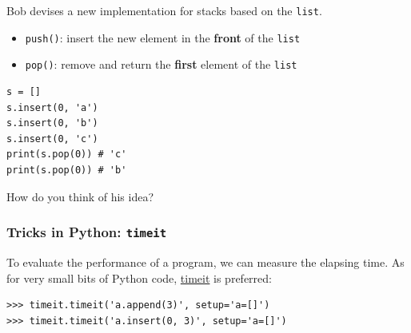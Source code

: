 \documentclass[aspectratio=169, 14pt]{beamer}
\begin{document}
\begin{frame}[fragile]
Bob devises a new implementation for stacks based on the \texttt{list}. 

\begin{itemize}
    \item \texttt{push()}: insert the new element in the \textbf{front} of the \texttt{list}
    \item \texttt{pop()}: remove and return the \textbf{first} element of the \texttt{list}
\end{itemize}

\begin{verbatim}
s = []
s.insert(0, 'a')
s.insert(0, 'b')
s.insert(0, 'c')
print(s.pop(0)) # 'c'
print(s.pop(0)) # 'b'
\end{verbatim}  
    
{\large {}} How do you think of his idea?
\end{frame}

\begin{frame}

\begin{center}
    
\end{center}    

\end{frame}

\begin{frame}[fragile]
    \frametitle{Tricks in Python: \texttt{timeit}}
To evaluate the performance of a program, we can measure the elapsing time. As for very small bits of Python code, \href{https://docs.python.org/3/library/timeit.html}{timeit} is preferred:

\begin{verbatim}
>>> timeit.timeit('a.append(3)', setup='a=[]')
>>> timeit.timeit('a.insert(0, 3)', setup='a=[]')
\end{verbatim}

\end{frame}
\end{document}
